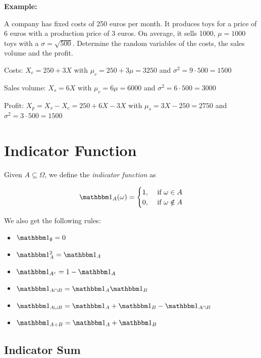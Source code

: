 \textbf{Example:}

A company has fixed costs of 250 euros per month. It produces toys for a price of 6 euros with a production price of 3 euros. On 
average, it sells 1000, \(\mu = 1000\) toys with a \(\sigma = \sqrt{500}\). Determine the random variables of the costs, the sales volume and the profit.

Costs: \(X_c = 250 + 3X\) with \(\mu_c =  250 + 3 \mu = 3250\) and \(\sigma^2 = 9\cdot 500 = 1500\)

Sales volume: \(X_s = 6X\) with \(\mu_c =   6\mu = 6000\) and \(\sigma^2 = 6\cdot 500 = 3000\)

Profit: \(X_p = X_s - X_c = 250 + 6X - 3X\) with \(\mu_s = 3X - 250 = 2750\) and \(\sigma^2 = 3 \cdot 500 = 1500\)

\section{Indicator Function} 

Given \(A \subseteq \Omega\), we define the \emph{indicator function} as 

\[
    \ind_A (\omega) = \begin{cases}
	1,& \text{ if }  \omega \in A \\ 
	0,& \text{ if }  \omega \notin A
    \end{cases}
\]

We also get the following rules:

\begin{itemize}
    
    \item \(\ind_\emptyset = 0\)
    
    \item \(\ind_{A}^2 = \ind_{A}\)
    
    \item \(\ind_{A^c} = 1 - \ind_A\)

    \item \(\ind_{A \cap B} = \ind_A \ind_B \)

    \item \(\ind_{A \cup B} = \ind_A  + \ind_B - \ind_{A \cap B} \)

    \item \(\ind_{A + B} = \ind_A  + \ind_B \)
    
\end{itemize}

\subsection{Indicator Sum}

